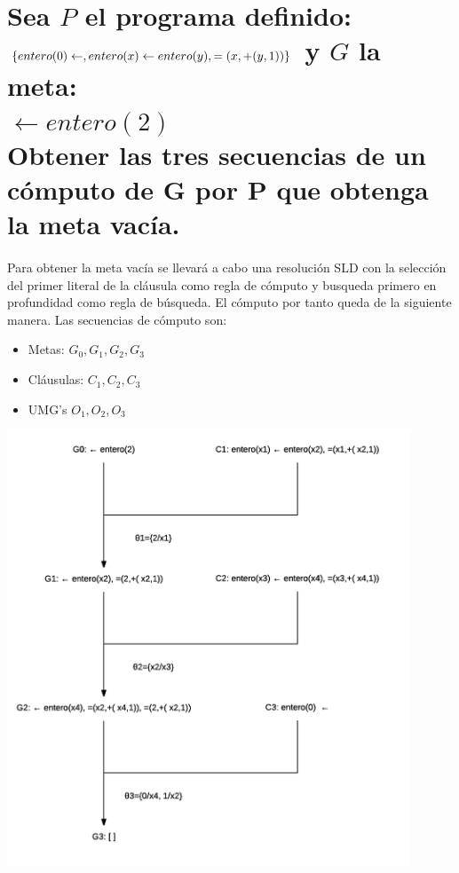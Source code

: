 \documentclass[11pt, a4paper,spanish]{article}
\begin{document}
	\clearpage
	\section{Sea $P$ el programa definido: \\
		$\{entero(0) \gets ,\\
		entero(x) \gets entero(y), =(x, +(y,1))\}\\$
		y $G$ la meta: \\
		$\gets entero(2)$\\
		Obtener las tres secuencias de un cómputo de G por P que obtenga la meta vacía.}

		\paragraph{}
		Para obtener la meta vacía se llevará a cabo una resolución SLD con la selección del primer literal de la cláusula como regla de cómputo y busqueda primero en profundidad como regla de búsqueda. El cómputo por tanto queda de la siguiente manera. Las secuencias de cómputo son:
		\begin{itemize}
			\item Metas: $G_0, G_1, G_2,G_3$
			\item Cláusulas: $C_1, C_2,C_3$
			\item UMG's $O_1, O_2, O_3$
		\end{itemize}
		\includegraphics[width=0.9\textwidth]{sld-computation}
\end{document}
